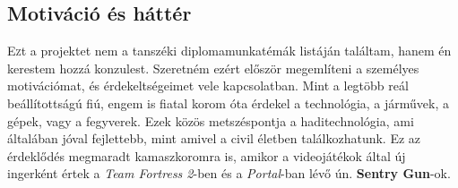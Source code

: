 \documentclass[12pt,a4paper]{article}
\begin{document}
\subsection{Motiváció és háttér}

\lettrine{E}zt a projektet nem a tanszéki diplomamunkatémák listáján találtam, hanem én kerestem hozzá konzulest. Szeretném ezért először megemlíteni a személyes motivációmat, és érdekeltségeimet vele kapcsolatban. Mint a legtöbb reál beállítottságú fiú, engem is fiatal korom óta érdekel a technológia, a járművek, a gépek, vagy a fegyverek. Ezek közös metszéspontja a haditechnológia, ami általában jóval fejlettebb, mint amivel a civil életben találkozhatunk. Ez az érdeklődés megmaradt kamaszkoromra is, amikor a videojátékok által új ingerként értek a \textsl{Team Fortress 2}-ben és a \textsl{Portal}-ban lévő ún. \textbf{Sentry Gun}-ok. \\[5mm]
\end{document}
